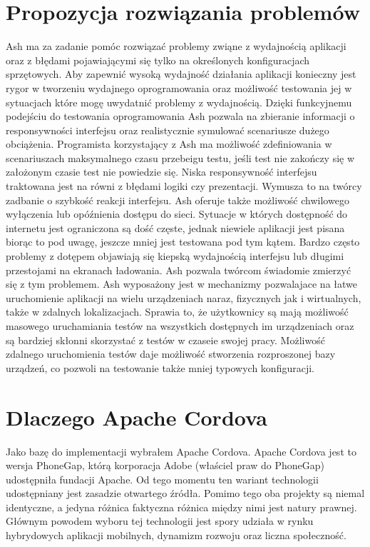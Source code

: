 \documentclass[brudnopis]{xmgr}
\begin{document}
\section{Propozycja rozwiązania problemów}
Ash ma za zadanie pomóc rozwiązać problemy zwiąne z wydajnością aplikacji oraz z
błędami pojawiającymi się tylko na określonych konfiguracjach sprzętowych. Aby
zapewnić wysoką wydajność działania aplikacji konieczny jest rygor w tworzeniu
wydajnego oprogramowania oraz możliwość testowania jej w sytuacjach które mogę
uwydatnić problemy z wydajnością. Dzięki funkcyjnemu podejściu do testowania
oprogramowania Ash pozwala na zbieranie informacji o responsywności interfejsu
oraz realistycznie symulować scenariusze dużego obciążenia. Programista
korzystający z Ash ma możliwość zdefiniowania w scenariuszach maksymalnego
czasu przebeigu testu, jeśli test nie zakończy się w założonym czasie test nie
powiedzie się. Niska responsywność interfejsu traktowana jest na równi z błędami
logiki czy prezentacji. Wymusza to na twórcy zadbanie o szybkość reakcji interfejsu.
Ash oferuje także możliwość chwilowego wyłączenia lub opóźnienia dostępu do
sieci. Sytuacje w których dostępność do internetu jest ograniczona są dość częste,
jednak niewiele aplikacji jest pisana biorąc to pod uwagę, jeszcze mniej jest
testowana pod tym kątem. Bardzo często problemy z dotępem objawiają się kiepską
wydajnością interfejsu lub długimi przestojami na ekranach ładowania. Ash pozwala
twórcom świadomie zmierzyć się z tym problemem. Ash wyposażony jest w
mechanizmy pozwalajace na łatwe uruchomienie aplikacji na wielu urządzeniach
naraz, fizycznych jak i wirtualnych, także w zdalnych lokalizacjach. Sprawia to, że
użytkownicy są mają możliwość masowego uruchamiania testów na wszystkich
dostępnych im urządzeniach oraz są bardziej skłonni skorzystać z testów w czaseie
swojej pracy. Możliwość zdalnego uruchomienia testów daje możliwość stworzenia
rozproszonej bazy urządzeń, co pozwoli na testowanie także mniej typowych
konfiguracji.

\section{Dlaczego Apache Cordova}
Jako bazę do implementacji wybrałem Apache Cordova. Apache Cordova jest to
wersja PhoneGap, którą korporacja Adobe (właściel praw do PhoneGap) udostępniła
fundacji Apache. Od tego momentu ten wariant technologii udostępniany jest
zasadzie otwartego źródła. Pomimo tego oba projekty są niemal identyczne, a jedyna
różnica faktyczna różnica między nimi jest natury prawnej. Głównym powodem
wyboru tej technologii jest spory udziała w rynku hybrydowych aplikacji mobilnych,
dynamizm rozwoju oraz liczna społeczność.
\end{document}

